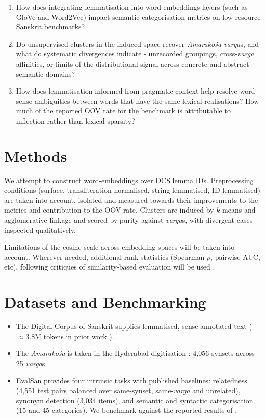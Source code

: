 \documentclass[11pt,a4paper]{article}
\begin{document}
    \begin{enumerate}
        \item[\textbf{RQ1}] How does integrating lemmatisation into word-embeddings layers (such as GloVe and Word2Vec) \cite{Jurafsky} impact semantic categorisation metrics on low-resource Sanskrit benchmarks?
        \item[\textbf{RQ2}] Do unsupervised clusters in the induced space recover \textit{Amarako\'sa varga}s, and what do systematic divergences indicate - unrecorded groupings, cross-\textit{varga} affinities, or limits of the distributional signal across concrete and abstract semantic domains?
        \item[\textbf{RQ3}] How does lemmatisation informed from pragmatic context help resolve word-sense ambiguities between words that have the same lexical realisations? How much of the reported OOV rate for the benchmark is attributable to inflection rather than lexical sparsity?
    \end{enumerate}

\section{Methods}

    We attempt to construct word-embeddings over DCS lemma IDs.
    Preprocessing conditions (surface, transliteration-normalised, string-lemmatised, ID-lemmatised) are taken into account, isolated and measured towards their improvements to the metrics and contribution to the OOV rate.
    Clusters are induced by $k$-means and agglomerative linkage and scored by purity against \textit{varga}s, with divergent cases inspected qualitatively.

    Limitations of the cosine scale across embedding spaces will be taken into account. Wherever needed, additional rank statistics (Spearman $\rho$, pairwise AUC, etc), following critiques of similarity-based evaluation will be used \cite{Schnabel} \cite{Faruqui}.

\section{Datasets and Benchmarking}

    \begin{itemize}
        \item The Digital Corpus of Sanskrit \cite{Hellwig} supplies lemmatised, sense-annotated text ($\approx$3.8M tokens in prior work \cite{Sandhan}).
        \item The \textit{Amarako\'sa} is taken in the Hyderabad digitisation \cite{Nair}: 4{,}056 synsets across 25 \textit{varga}s.
        \item EvalSan \cite{Sandhan} provides four intrinsic tasks with published baselines: relatedness (4{,}551 test pairs balanced over same-synset, same-\textit{varga} and unrelated), synonym detection (3{,}034 items), and semantic and syntactic categorisation (15 and 45 categories).
        We benchmark against the reported results of \cite{Sandhan}.
    \end{itemize}
\end{document}
